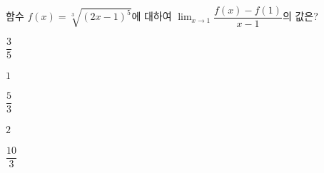 함수 $f(x)=\sqrt[3]{(2x-1)^5}$에 대하여 $\displaystyle\lim_{x\to 1}\dfrac{f(x)-f(1)}{x-1}$의 값은?
\begin{choices32}{\rule[-3ex]{0pt}{8ex}$\dfrac{3}{5}$}{\rule[-3ex]{0pt}{8ex}$1$}{\rule[-3ex]{0pt}{8ex}$\dfrac{5}{3}$}{\rule[-3ex]{0pt}{8ex}$2$}{\rule[-3ex]{0pt}{8ex}$\dfrac{10}{3}$}\end{choices32}
